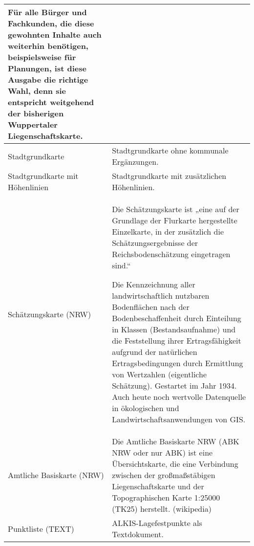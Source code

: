 \begin{longtable}{|p{}|p{}|}
	Für alle Bürger und Fachkunden, die diese gewohnten Inhalte auch weiterhin benötigen, beispielsweise für Planungen, ist diese Ausgabe die richtige Wahl, denn sie entspricht weitgehend der bisherigen Wuppertaler Liegenschaftskarte. \autocite{wupp-alkis} \\
	\hline
	Stadtgrundkarte
	&
	Stadtgrundkarte ohne kommunale Ergänzungen. \\
	\hline
	Stadtgrundkarte mit Höhenlinien
	&
	Stadtgrundkarte mit zusätzlichen Höhenlinien. \\
	\hline
	Schätzungskarte (NRW)
	&
	Die Schätzungskarte ist „eine auf der Grundlage der Flurkarte hergestellte Einzelkarte, in der zusätzlich die Schätzungsergebnisse der Reichsbodenschätzung eingetragen sind.“  \autocite{gg-schaetzungskarte}
			
	Die Kennzeichnung aller landwirtschaftlich nutzbaren Bodenflächen nach der Bodenbeschaffenheit durch Einteilung in Klassen (Bestandsaufnahme) und die Feststellung ihrer Ertragsfähigkeit aufgrund der natürlichen Ertragsbedingungen durch Ermittlung von Wertzahlen (eigentliche Schätzung). Gestartet im Jahr 1934. Auch heute noch wertvolle Datenquelle in ökologischen und Landwirtschaftsanwendungen von GIS. \autocite{gg-reichsbodenschaetzung} \\
			
	\hline
	Amtliche Basiskarte (NRW)
	&
	Die Amtliche Basiskarte NRW (ABK NRW oder nur ABK) ist eine Übersichtskarte, die eine Verbindung zwischen der großmaßstäbigen Liegenschaftskarte und der Topographischen Karte 1:25000 (TK25) herstellt. (wikipedia) \\
	\hline
	Punktliste (TEXT)
	&
	ALKIS-Lagefestpunkte als Textdokument.
			

\end{longtable}
